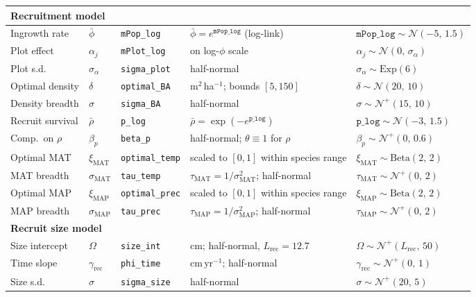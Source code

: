 \begin{longtable}{@{}p{2.1cm} p{2.1cm} p{2.1cm} p{4.3cm} p{3.6cm}@{}}
\multicolumn{5}{l}{\textbf{Recruitment model}}\\
\midrule
Ingrowth rate & $\bar{\phi}$ & \texttt{mPop\_log} & $\bar{\phi}=e^{\texttt{mPop\_log}}$ (log-link) & $\texttt{mPop\_log}\sim\mathcal{N}(-5,\,1.5)$ \\
Plot effect & $\alpha_{j}$ & \texttt{mPlot\_log} & on log-$\phi$ scale & $\alpha_{j}\sim\mathcal{N}(0,\,\sigma_{\alpha})$ \\
Plot s.d. & $\sigma_{\alpha}$ & \texttt{sigma\_plot} & half-normal & $\sigma_{\alpha}\sim\mathrm{Exp}(6)$ \\
Optimal density & $\delta$ & \texttt{optimal\_BA} & m$^{2}$\,ha$^{-1}$; bounds $[5,150]$ & $\delta\sim\mathcal{N}(20,\,10)$ \\
Density breadth & $\sigma$ & \texttt{sigma\_BA} & half-normal & $\sigma\sim\mathcal{N}^{+}(15,\,10)$ \\
Recruit survival & $\bar{\rho}$ & \texttt{p\_log} & $\bar{\rho}=\exp(-e^{\texttt{p\_log}})$ & $\texttt{p\_log}\sim\mathcal{N}(-3,\,1.5)$ \\
Comp.\ on $\rho$ & $\beta_{p}$ & \texttt{beta\_p} & half-normal; $\theta\equiv 1$ for $\rho$ & $\beta_{p}\sim\mathcal{N}^{+}(0,\,0.6)$ \\
Optimal MAT & $\xi_{\mathrm{MAT}}$ & \texttt{optimal\_temp} & scaled to $[0,1]$ within species range & $\xi_{\mathrm{MAT}}\sim\mathrm{Beta}(2,\,2)$ \\
MAT breadth & $\sigma_{\mathrm{MAT}}$ & \texttt{tau\_temp} & $\tau_{\mathrm{MAT}}=1/\sigma_{\mathrm{MAT}}^{2}$; half-normal & $\tau_{\mathrm{MAT}}\sim\mathcal{N}^{+}(0,\,2)$ \\
Optimal MAP & $\xi_{\mathrm{MAP}}$ & \texttt{optimal\_prec} & scaled to $[0,1]$ within species range & $\xi_{\mathrm{MAP}}\sim\mathrm{Beta}(2,\,2)$ \\
MAP breadth & $\sigma_{\mathrm{MAP}}$ & \texttt{tau\_prec} & $\tau_{\mathrm{MAP}}=1/\sigma_{\mathrm{MAP}}^{2}$; half-normal & $\tau_{\mathrm{MAP}}\sim\mathcal{N}^{+}(0,\,2)$ \\
\midrule

\multicolumn{5}{l}{\textbf{Recruit size model}}\\
\midrule
Size intercept & $\Omega$ & \texttt{size\_int} & cm; half-normal, $L_{\mathrm{rec}}=12.7$ & $\Omega\sim\mathcal{N}^{+}(L_{\mathrm{rec}},\,50)$ \\
Time slope & $\gamma_{\mathrm{rec}}$ & \texttt{phi\_time} & cm\,yr$^{-1}$; half-normal & $\gamma_{\mathrm{rec}}\sim\mathcal{N}^{+}(0,\,1)$ \\
Size s.d. & $\sigma$ & \texttt{sigma\_size} & half-normal & $\sigma\sim\mathcal{N}^{+}(20,\,5)$ \\

\end{longtable}

